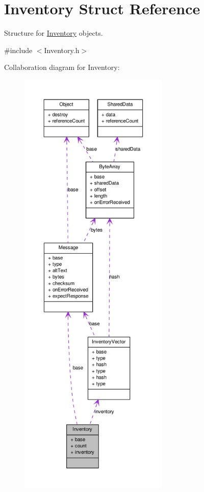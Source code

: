 \hypertarget{struct_inventory}{
\section{Inventory Struct Reference}
\label{struct_inventory}
}


Structure for \hyperlink{struct_inventory}{Inventory} objects.  




{\ttfamily \#include $<$Inventory.h$>$}



Collaboration diagram for Inventory:
\nopagebreak
\begin{figure}[H]
\begin{center}
\leavevmode
\includegraphics[height=600pt]{struct_inventory__coll__graph}
\end{center}
\end{figure}
